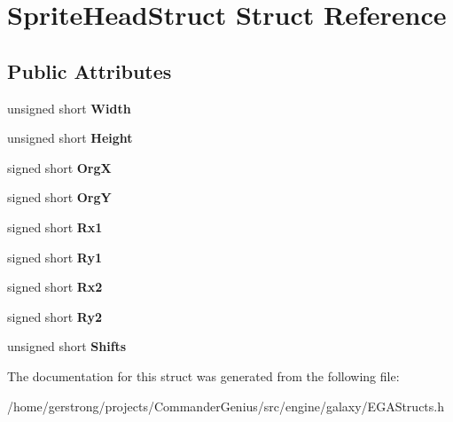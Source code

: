 \hypertarget{struct_sprite_head_struct}{
\section{SpriteHeadStruct Struct Reference}
\label{struct_sprite_head_struct}
}
\subsection*{Public Attributes}
\begin{DoxyCompactItemize}
\item 
\hypertarget{struct_sprite_head_struct_aef0d8899480b94724eca28e100408399}{
unsigned short {\bfseries Width}}
\label{struct_sprite_head_struct_aef0d8899480b94724eca28e100408399}

\item 
\hypertarget{struct_sprite_head_struct_ac2ece18a5d84d8d80ae7742bc6de930a}{
unsigned short {\bfseries Height}}
\label{struct_sprite_head_struct_ac2ece18a5d84d8d80ae7742bc6de930a}

\item 
\hypertarget{struct_sprite_head_struct_a1215014b8cd04760929b2539359276a9}{
signed short {\bfseries OrgX}}
\label{struct_sprite_head_struct_a1215014b8cd04760929b2539359276a9}

\item 
\hypertarget{struct_sprite_head_struct_a2aae02d976a0bb49f0dd0ebe6436b1c0}{
signed short {\bfseries OrgY}}
\label{struct_sprite_head_struct_a2aae02d976a0bb49f0dd0ebe6436b1c0}

\item 
\hypertarget{struct_sprite_head_struct_aae3f363b468477fb6b9ff76fb763df4c}{
signed short {\bfseries Rx1}}
\label{struct_sprite_head_struct_aae3f363b468477fb6b9ff76fb763df4c}

\item 
\hypertarget{struct_sprite_head_struct_ac8a494cbbc667fa2f9776f308e46216b}{
signed short {\bfseries Ry1}}
\label{struct_sprite_head_struct_ac8a494cbbc667fa2f9776f308e46216b}

\item 
\hypertarget{struct_sprite_head_struct_a8507171471a2bf619e51f658942d3ea7}{
signed short {\bfseries Rx2}}
\label{struct_sprite_head_struct_a8507171471a2bf619e51f658942d3ea7}

\item 
\hypertarget{struct_sprite_head_struct_a5f16fd83003af20da2fc3385aab23654}{
signed short {\bfseries Ry2}}
\label{struct_sprite_head_struct_a5f16fd83003af20da2fc3385aab23654}

\item 
\hypertarget{struct_sprite_head_struct_a36bdf509eb757f7eb77349cf5b76f64c}{
unsigned short {\bfseries Shifts}}
\label{struct_sprite_head_struct_a36bdf509eb757f7eb77349cf5b76f64c}

\end{DoxyCompactItemize}


The documentation for this struct was generated from the following file:\begin{DoxyCompactItemize}
\item 
/home/gerstrong/projects/CommanderGenius/src/engine/galaxy/EGAStructs.h\end{DoxyCompactItemize}
